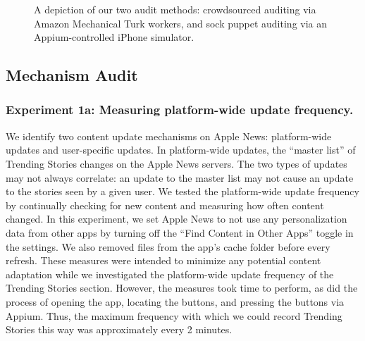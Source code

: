 \begin{figure}[t]
    \centering
{}
    \caption{A depiction of our two audit methods: crowdsourced auditing via Amazon Mechanical Turk workers, and sock puppet auditing via an Appium-controlled iPhone simulator.}
    \label{fig:my_label}
\end{figure}


\subsection{Mechanism Audit}

\subsubsection{Experiment 1a: Measuring platform-wide update frequency.}\label{platform-wide}
We identify two content update mechanisms on Apple News: platform-wide updates and user-specific updates. In platform-wide updates, the ``master list'' of Trending Stories changes on the Apple News servers. The two types of updates may not always correlate: an update to the master list may not cause an update to the stories seen by a given user. We tested the platform-wide update frequency by continually checking for new content and measuring how often content changed. In this experiment, we set Apple News to not use any personalization data from other apps by turning off the ``Find Content in Other Apps'' toggle in the settings. We also removed files from the app's cache folder before every refresh. These measures were intended to minimize any potential content adaptation while we investigated the platform-wide update frequency of the Trending Stories section. However, the measures took time to perform, as did the process of opening the app, locating the buttons, and pressing the buttons via Appium. Thus, the maximum frequency with which we could record Trending Stories this way was approximately every 2 minutes.

